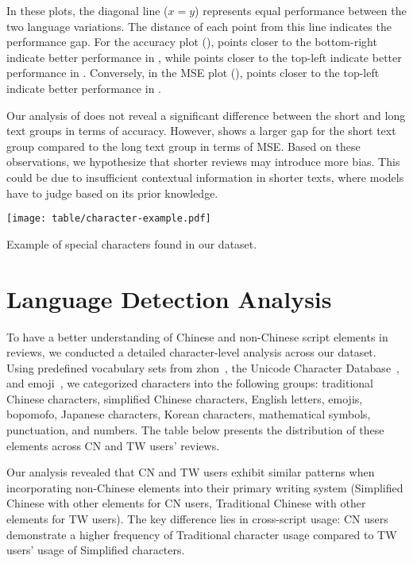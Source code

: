 In these plots, the diagonal line ($x=y$) represents equal performance between the two language variations.
The distance of each point from this line indicates the performance gap.
For the accuracy plot (), points closer to the bottom-right indicate better performance in \cnChinese, while points closer to the top-left indicate better performance in \twChinese.
Conversely, in the MSE plot (), points closer to the top-left indicate better performance in \cnChinese.

Our analysis of  does not reveal a significant difference between the short and long text groups in terms of accuracy.
However,  shows a larger gap for the short text group compared to the long text group in terms of MSE. 
Based on these observations, we hypothesize that shorter reviews may introduce more bias. This could be due to insufficient contextual information in shorter texts, where models have to judge based on its prior knowledge.


\begin{table}[t]
  \texttt{[image: table/character-example.pdf]}
  \caption{Example of special characters found in our dataset.}
  \label{tab:special-characters}
\end{table}


\section{Language Detection Analysis\label{appendix:language-analysis}}
To have a better understanding of Chinese and non-Chinese script elements in reviews, we conducted a detailed character-level analysis across our dataset. Using predefined vocabulary sets from zhon~\cite{githubzhon}, the Unicode Character Database~\cite{unicode}, and emoji~\cite{githubemoji}, we categorized characters into the following groups: traditional Chinese characters, simplified Chinese characters, English letters, emojis, bopomofo, Japanese characters, Korean characters, mathematical symbols, punctuation, and numbers. The table below presents the distribution of these elements across CN and TW users' reviews.

Our analysis revealed that CN and TW users exhibit similar patterns when incorporating non-Chinese elements into their primary writing system (Simplified Chinese with other elements for CN users, Traditional Chinese with other elements for TW users). The key difference lies in cross-script usage: CN users demonstrate a higher frequency of Traditional character usage compared to TW users' usage of Simplified characters.

